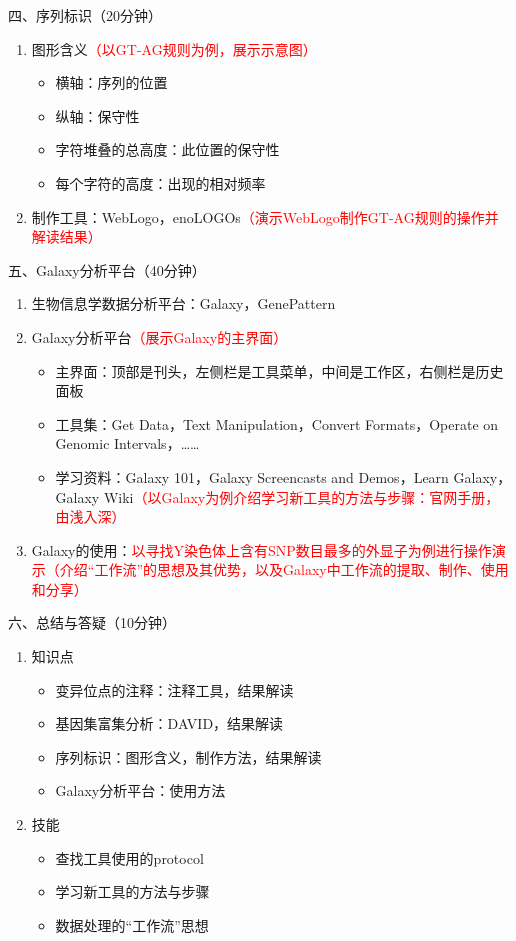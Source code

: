 \documentclass{TIJMUjiaoanLL}
\begin{document}
\noindent
四、序列标识（20分钟）
\begin{enumerate}
  \item 图形含义\textcolor{red}{（以GT-AG规则为例，展示示意图）}
    \begin{itemize}
      \item 横轴：序列的位置
      \item 纵轴：保守性
      \item 字符堆叠的总高度：此位置的保守性
      \item 每个字符的高度：出现的相对频率
    \end{itemize}
  \item 制作工具：WebLogo，enoLOGOs\textcolor{red}{（演示WebLogo制作GT-AG规则的操作并解读结果）}
\end{enumerate}

\otherTail
\newpage
\otherHeader

\noindent
五、Galaxy分析平台（40分钟）
\begin{enumerate}
  \item 生物信息学数据分析平台：Galaxy，GenePattern
  \item Galaxy分析平台\textcolor{red}{（展示Galaxy的主界面）}
    \begin{itemize}
      \item 主界面：顶部是刊头，左侧栏是工具菜单，中间是工作区，右侧栏是历史面板
      \item 工具集：Get Data，Text Manipulation，Convert Formats，Operate on Genomic Intervals，……
      \item 学习资料：Galaxy 101，Galaxy Screencasts and Demos，Learn
	Galaxy，Galaxy Wiki\textcolor{red}{（以Galaxy为例介绍学习新工具的方法与步骤：官网手册，由浅入深）}
    \end{itemize}
  \item Galaxy的使用：\textcolor{red}{以寻找Y染色体上含有SNP数目最多的外显子为例进行操作演示}\textcolor{red}{（介绍“工作流”的思想及其优势，以及Galaxy中工作流的提取、制作、使用和分享）}
\end{enumerate}

\noindent
六、总结与答疑（10分钟）
\begin{enumerate}
  \item 知识点
    \begin{itemize}
      \item 变异位点的注释：注释工具，结果解读
      \item 基因集富集分析：DAVID，结果解读
      \item 序列标识：图形含义，制作方法，结果解读
      \item Galaxy分析平台：使用方法
    \end{itemize}
  \item 技能
    \begin{itemize}
      \item 查找工具使用的protocol
      \item 学习新工具的方法与步骤
      \item 数据处理的“工作流”思想
    \end{itemize}
\end{enumerate}

\otherTail
\end{document}
